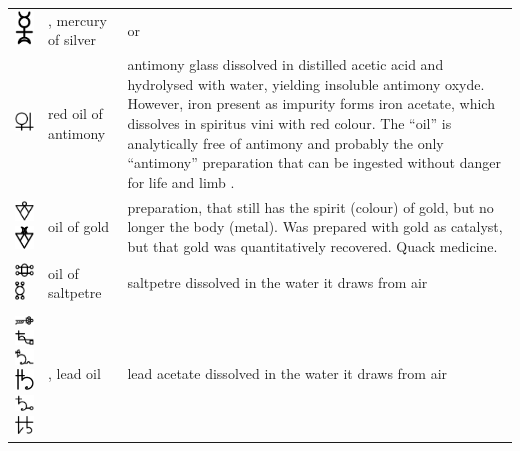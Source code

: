 \documentclass[british,final,landscape]{scrartcl}
\begin{document}
\begin{refsection}
\begin{supertabular}{p{0.3\textwidth}p{0.34\textwidth}p{0.34\textwidth}}
   \includegraphics[width=5mm]{Mixtures/MercuryOfSilver} & , mercury of silver &  or  \\
   \includegraphics[width=5mm]{Mixtures/OilOfAntimony} & red oil of antimony & antimony glass dissolved in distilled acetic acid and hydrolysed with water, yielding insoluble antimony oxyde. However, iron present as impurity forms iron acetate, which dissolves in spiritus vini with red colour. The ``oil'' is analytically free of antimony and probably the only ``antimony'' preparation that can be ingested without danger for life and limb \parencite{Pri-87}. \\
   \includegraphics[width=5mm]{Mixtures/OilOfGold} \includegraphics[width=5mm]{Mixtures/OilOfGold2} & oil of gold & preparation, that still has the spirit (colour) of gold, but no longer the body (metal). Was prepared with gold as catalyst, but that gold was quantitatively recovered. Quack medicine.\\
   \includegraphics[width=5mm]{Mixtures/OilOfSaltpetre} \includegraphics[height=5mm]{Mixtures/OilOfSaltpetre2} & oil of saltpetre & saltpetre dissolved in the water it draws from air  \\
   \includegraphics[width=5mm]{Mixtures/OleumSaturni} \includegraphics[width=5mm]{Mixtures/OleumSaturni2} \includegraphics[width=5mm]{Mixtures/OleumSaturni3} \includegraphics[width=5mm]{Mixtures/OleumSaturni4} \includegraphics[width=5mm]{Mixtures/OleumSaturni5} \includegraphics[width=5mm]{Mixtures/OleumSaturni6} & , lead oil & lead acetate dissolved in the water it draws from air \\

\end{supertabular}
\end{refsection}
\end{document}
